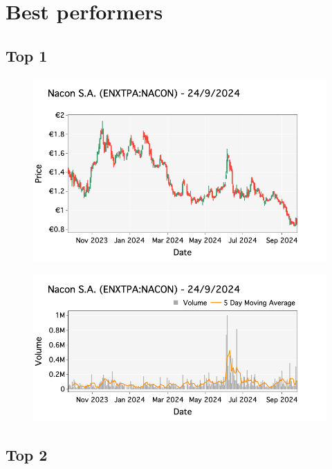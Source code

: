 \documentclass[a4paper, twocolumn, 11pt, paperequity]{gorgona}
\begin{document}
\newpage
\section*{Best performers}
\subsection*{Top 1}

\begin{figure}[H]
    \centering
    \includegraphics[width=\columnwidth]{France/images/Top_Returns/Top_1_candlestick.png}
\end{figure}

\begin{figure}[H]
    \centering
    \includegraphics[width=\columnwidth]{France/images/Top_Returns/Top_1_volume.png}
\end{figure}

\subsection*{Top 2}
\end{document}
